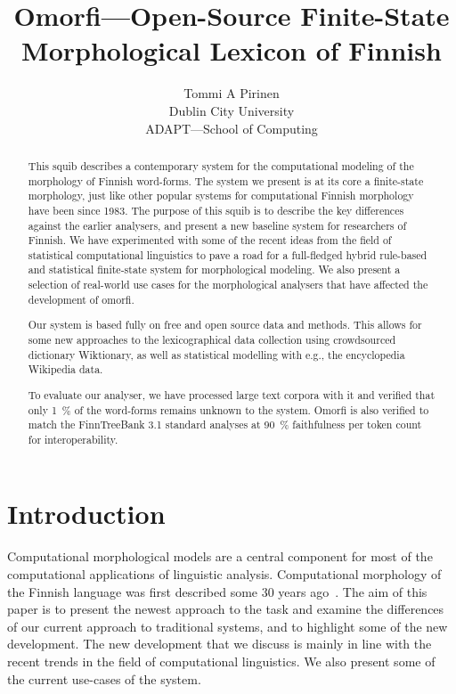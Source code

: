 \documentclass[a4paper,12pt]{article}
\title{Omorfi---Open-Source Finite-State Morphological Lexicon of Finnish}
\author{Tommi A Pirinen \\
    Dublin City University\\
    ADAPT---School of Computing}
\date{}
\begin{document}
\maketitle
\begin{abstract}

    This squib describes a contemporary system for the computational modeling of
    the morphology of Finnish word-forms. The system we present is at its core a
    finite-state morphology, just like other popular systems for computational
    Finnish morphology have been since 1983.  The purpose of this squib is to
    describe the key differences against the earlier analysers, and present
    a new baseline system for researchers of Finnish. We have experimented with
    some of the recent ideas from the field of statistical computational
    linguistics to pave a road for a full-fledged hybrid rule-based and
    statistical finite-state system for morphological modeling. We also present
    a selection of real-world use cases for the morphological analysers that
    have affected the development of omorfi.

    Our system is based fully on free and open source
    data and methods. This allows for some new
    approaches to the lexicographical data collection
    using crowd\-sour\-ced dictionary Wiktionary, as
    well as statistical modelling with e.g., the
    encyclopedia Wikipedia data.

    To evaluate our analyser, we have processed large text corpora with it
    and verified that only 1~\% of the word-forms remains unknown to the
    system. Omorfi is also verified to match the FinnTreeBank 3.1 standard
    analyses at 90~\% faithfulness per token count for interoperability.
\end{abstract}

\section{Introduction}

Computational morphological models are a central component for most of the
computational applications of linguistic analysis. Computational morphology
of the Finnish language was first described some 30 years
ago~\citep{koskenniemi1983twolevel}. The aim of this paper is to present the
newest approach to the task and examine the differences of our current approach
to traditional systems, and to highlight some of the new development. The
new development that we discuss is mainly in line with the recent trends in
the field of computational linguistics. We also present some of the current
use-cases of the system.
\end{document}
